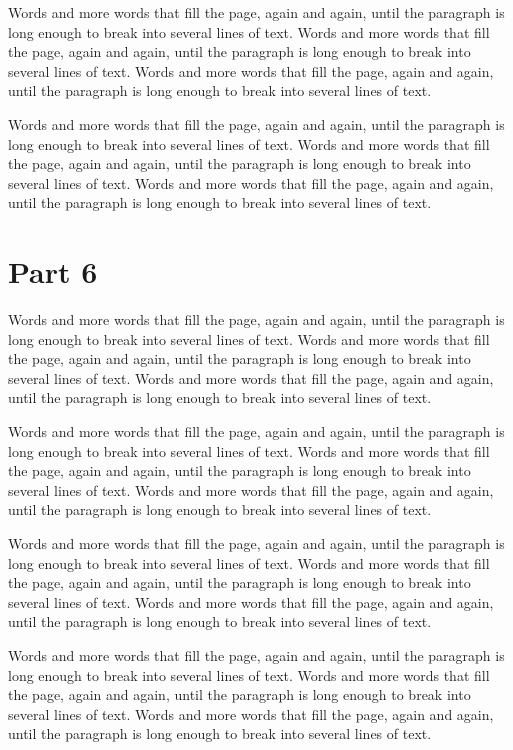 \documentclass{article}
\begin{document}
Words and more words that fill the page, again and again, until the paragraph is long enough to break into several lines of text. Words and more words that fill the page, again and again, until the paragraph is long enough to break into several lines of text. Words and more words that fill the page, again and again, until the paragraph is long enough to break into several lines of text. 

Words and more words that fill the page, again and again, until the paragraph is long enough to break into several lines of text. Words and more words that fill the page, again and again, until the paragraph is long enough to break into several lines of text. Words and more words that fill the page, again and again, until the paragraph is long enough to break into several lines of text. 

\section{Part 6}
Words and more words that fill the page, again and again, until the paragraph is long enough to break into several lines of text. Words and more words that fill the page, again and again, until the paragraph is long enough to break into several lines of text. Words and more words that fill the page, again and again, until the paragraph is long enough to break into several lines of text. 

Words and more words that fill the page, again and again, until the paragraph is long enough to break into several lines of text. Words and more words that fill the page, again and again, until the paragraph is long enough to break into several lines of text. Words and more words that fill the page, again and again, until the paragraph is long enough to break into several lines of text. 

Words and more words that fill the page, again and again, until the paragraph is long enough to break into several lines of text. Words and more words that fill the page, again and again, until the paragraph is long enough to break into several lines of text. Words and more words that fill the page, again and again, until the paragraph is long enough to break into several lines of text. 

Words and more words that fill the page, again and again, until the paragraph is long enough to break into several lines of text. Words and more words that fill the page, again and again, until the paragraph is long enough to break into several lines of text. Words and more words that fill the page, again and again, until the paragraph is long enough to break into several lines of text. 
\end{document}
